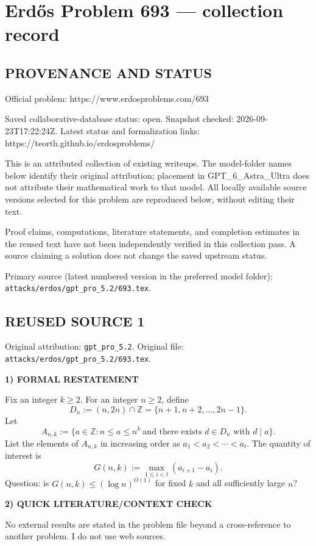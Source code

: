 \section*{Erd\H{o}s Problem 693 --- collection record}

\subsection*{PROVENANCE AND STATUS}
Official problem: https://www.erdosproblems.com/693

Saved collaborative-database status: open.
Snapshot checked: 2026-09-23T17:22:24Z.
Latest status and formalization links: https://teorth.github.io/erdosproblems/

This is an attributed collection of existing writeups. The model-folder names below identify their original attribution; placement in GPT\_6\_Astra\_Ultra does not attribute their mathematical work to that model. All locally available source versions selected for this problem are reproduced below, without editing their text.

Proof claims, computations, literature statements, and completion estimates in the reused text have not been independently verified in this collection pass. A source claiming a solution does not change the saved upstream status.

Primary source (latest numbered version in the preferred model folder): \texttt{attacks/erdos/gpt\_pro\_5.2/693.tex}.

\subsection*{REUSED SOURCE 1}
Original attribution: \texttt{gpt\_pro\_5.2}.
Original file: \texttt{attacks/erdos/gpt\_pro\_5.2/693.tex}.


\noindent\textbf{1) FORMAL RESTATEMENT}

Fix an integer $k\ge 2$. For an integer $n\ge 2$, define
\[
D_n := (n,2n)\cap\mathbb{Z} = \{n+1,n+2,\dots,2n-1\}.
\]
Let
\[
A_{n,k}:=\{a\in\mathbb{Z}: n\le a\le n^k\ \text{and there exists }d\in D_n\text{ with }d\mid a\}.
\]
List the elements of $A_{n,k}$ in increasing order as $a_1<a_2<\cdots<a_t$. The quantity of interest is
\[
G(n,k):=\max_{1\le i<t}(a_{i+1}-a_i).
\]
Question: is $G(n,k)\le (\log n)^{O(1)}$ for fixed $k$ and all sufficiently large $n$?

\bigskip
\noindent\textbf{2) QUICK LITERATURE/CONTEXT CHECK}

No external results are stated in the problem file beyond a cross-reference to another problem. I do not use web sources.

